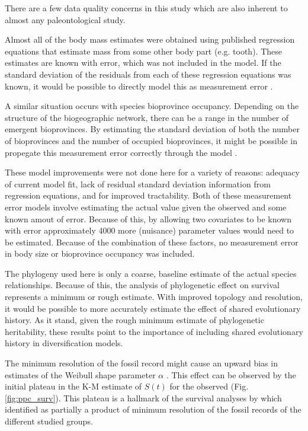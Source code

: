 \documentclass[12pt,letterpaper]{article}
\begin{document}
There are a few data quality concerns in this study which are also inherent to almost any paleontological study.

Almost all of the body mass estimates were obtained using published regression equations that estimate mass from some other body part (e.g. tooth). These estimates are known with error, which was not included in the model. If the standard deviation of the residuals from each of these regression equations was known, it would be possible to directly model this as measurement error \citep{Gelman2013d}. 

A similar situation occurs with species bioprovince occupancy. Depending on the structure of the biogeographic network, there can be a range in the number of emergent bioprovinces. By estimating the standard deviation of both the number of bioprovinces and the number of occupied bioprovinces, it might be possible in propegate this measurement error correctly through the model \citep{Gelman2013d}. 

These model improvements were not done here for a variety of reasons: adequacy of current model fit, lack of residual standard deviation information from regression equations, and for improved tractability. Both of these measurement error models involve estimating the actual value given the observed and some known amout of error. Because of this, by allowing two covariates to be known with error approximately 4000 more (nuisance) parameter values would need to be estimated. Because of the combination of these factors, no measurement error in body size or bioprovince occupancy was included.

The phylogeny used here is only a coarse, baseline estimate of the actual species relationships. Because of this, the analysis of phylogenetic effect on survival represents a minimum or rough estimate. With improved topology and resolution, it would be possible to more accurately estimate the effect of shared evolutionary history. As it stand, given the rough minimum estimate of phylogenetic heritability, these results point to the importance of including shared evolutionary history in diversification models.

The minimum resolution of the fossil record might cause an upward bias in estimates of the Weibull shape parameter \(\alpha\) \citep{Sepkoski1975}. This effect can be observed by the initial plateau in the K-M estimate of \(S(t)\) for the observed (Fig. \ref{fig:ppc_surv}). This plateau is a hallmark of the survival analyses by \citet{VanValen1973} which \citet{Sepkoski1975} identified as partially a product of minimum resolution of the fossil records of the different studied groups.
\end{document}
